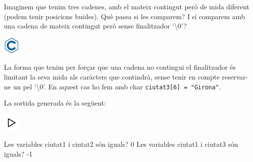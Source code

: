 \documentclass[]{book}
\newenvironment{Shaded}{\begin{snugshade}}{\end{snugshade}}
\newcommand{\DataTypeTok}[1]{\textcolor[rgb]{0.13,0.29,0.53}{#1}}
\newcommand{\DecValTok}[1]{\textcolor[rgb]{0.00,0.00,0.81}{#1}}
\newcommand{\SpecialCharTok}[1]{\textcolor[rgb]{0.00,0.00,0.00}{#1}}
\newcommand{\StringTok}[1]{\textcolor[rgb]{0.31,0.60,0.02}{#1}}
\newcommand{\ImportTok}[1]{#1}
\newcommand{\CommentTok}[1]{\textcolor[rgb]{0.56,0.35,0.01}{\textit{#1}}}
\newcommand{\PreprocessorTok}[1]{\textcolor[rgb]{0.56,0.35,0.01}{\textit{#1}}}
\newcommand{\NormalTok}[1]{#1}
\begin{document}
Imaginem que tenim tres cadenes, amb el mateix contingut però de mida
diferent (podem tenir posicions buides). Què passa si les comparem? I si
comparem amb una cadena de mateix contingut però sense finalitzador
`\textbackslash{}0'?

\includegraphics{./img/c.png}

\begin{Shaded}
\end{Shaded}

La forma que tenim per forçar que una cadena no contingui el
finalitzador és limitant la seva mida als caràcters que contindrà, sense
tenir en compte reservar-ne un pel `\textbackslash{}0'. En aquest cas ho
fem amb char \texttt{ciutat3{[}6{]}\ =\ "Girona"}.

La sortida generada és la següent:

\includegraphics{./img/play.png}

\begin{Shaded}
\begin{Highlighting}[]
\NormalTok{Les variables ciutat1 i ciutat2 són iguals? }\DecValTok{0}
\NormalTok{Les variables ciutat1 i ciutat3 són iguals? -}\DecValTok{1}
\end{Highlighting}
\end{Shaded}
\end{document}
